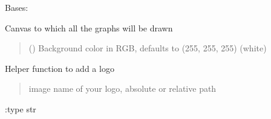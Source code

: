 \documentclass[letterpaper,10pt,english]{sphinxmanual}
\begin{document}
\begin{fulllineitems}
\label{\detokenize{index:sjvisualizer.Canvas.canvas}}
\pysigstartsignatures
{}
\pysigstopsignatures
\sphinxAtStartPar
Bases: 

\sphinxAtStartPar
Canvas to which all the graphs will be drawn
\begin{quote}\begin{description}
\sphinxAtStartPar
{} () \textendash{} Background color in RGB, defaults to (255, 255, 255) (white)

\end{description}\end{quote}

\begin{fulllineitems}
\label{\detokenize{index:sjvisualizer.Canvas.canvas.add_logo}}
\pysigstartsignatures
{}
\pysigstopsignatures
\sphinxAtStartPar
Helper function to add a logo
\begin{quote}\begin{description}
\sphinxAtStartPar
{} \textendash{} image name of your logo, absolute or relative path

\end{description}\end{quote}

\sphinxAtStartPar
:type str

\end{fulllineitems}



\end{fulllineitems}
\end{document}
